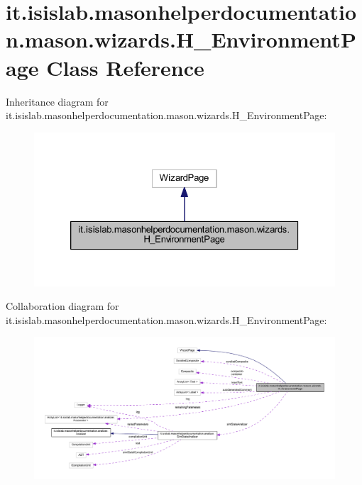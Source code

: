 \hypertarget{classit_1_1isislab_1_1masonhelperdocumentation_1_1mason_1_1wizards_1_1_h___environment_page}{\section{it.\-isislab.\-masonhelperdocumentation.\-mason.\-wizards.\-H\-\_\-\-Environment\-Page Class Reference}
\label{classit_1_1isislab_1_1masonhelperdocumentation_1_1mason_1_1wizards_1_1_h___environment_page}
}


Inheritance diagram for it.\-isislab.\-masonhelperdocumentation.\-mason.\-wizards.\-H\-\_\-\-Environment\-Page\-:
\nopagebreak
\begin{figure}[H]
\begin{center}
\leavevmode
\includegraphics[width=326pt]{classit_1_1isislab_1_1masonhelperdocumentation_1_1mason_1_1wizards_1_1_h___environment_page__inherit__graph}
\end{center}
\end{figure}


Collaboration diagram for it.\-isislab.\-masonhelperdocumentation.\-mason.\-wizards.\-H\-\_\-\-Environment\-Page\-:
\nopagebreak
\begin{figure}[H]
\begin{center}
\leavevmode
\includegraphics[width=350pt]{classit_1_1isislab_1_1masonhelperdocumentation_1_1mason_1_1wizards_1_1_h___environment_page__coll__graph}
\end{center}
\end{figure}
